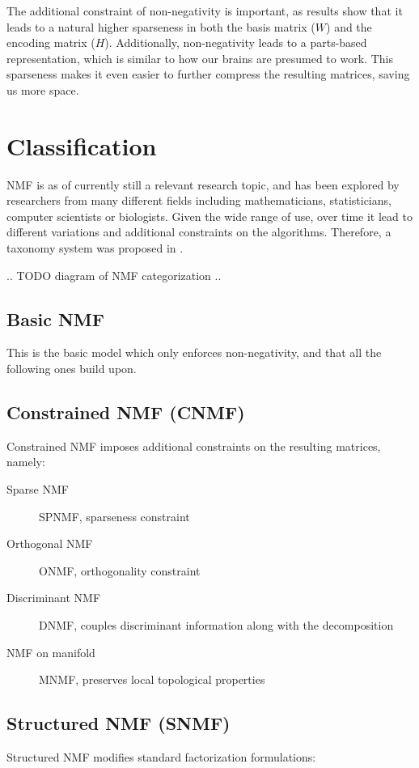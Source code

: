 The additional constraint of non-negativity is important, as results show that it leads to a natural higher sparseness in both the basis matrix ($W$) and the encoding matrix ($H$). Additionally, non-negativity leads to a parts-based representation, which is similar to how our brains are presumed to work. \cite{nmf_parts_objects} This sparseness makes it even easier to further compress the resulting matrices, saving us more space.

\section{Classification}
NMF is as of currently still a relevant research topic, and has been explored by researchers from many different fields including mathematicians, statisticians, computer scientists or biologists. Given the wide range of use, over time it lead to different variations and additional constraints on the algorithms. Therefore, a taxonomy system was proposed in \cite{wang_zhang_2013}.

.. TODO diagram of NMF categorization ..

\subsection{Basic NMF}
This is the basic model which only enforces non-negativity, and that all the following ones build upon.

\subsection{Constrained NMF (CNMF)}
Constrained NMF imposes additional constraints on the resulting matrices, namely:

\begin{description}
	\item[Sparse NMF] SPNMF, sparseness constraint
	\item[Orthogonal NMF] ONMF, orthogonality constraint
	\item[Discriminant NMF] DNMF, couples discriminant information along with the decomposition
	\item[NMF on manifold] MNMF, preserves local topological properties
\end{description}

\subsection{Structured NMF (SNMF)}
Structured NMF modifies standard factorization formulations:


